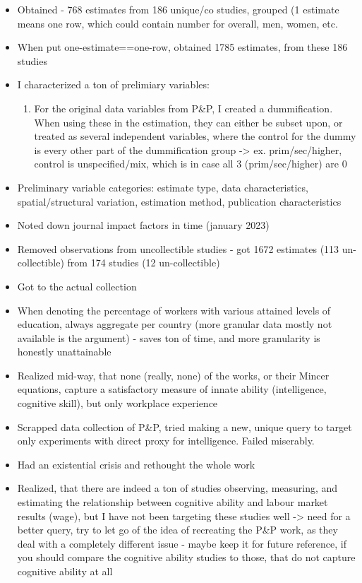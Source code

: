 \begin{itemize}
    \item Obtained - 768 estimates from 186 unique/co studies, grouped (1 estimate means one row, which could contain number for overall, men, women, etc.
    \item When put one-estimate==one-row, obtained 1785 estimates, from these 186 studies
    \item I characterized a ton of prelimiary variables:
        \begin{enumerate}
            \item For the original data variables from P\&P, I created a dummification. When using these in the estimation, they can either be subset upon, or treated as several independent variables, where the control for the dummy is every other part of the dummification group -> ex. prim/sec/higher, control is unspecified/mix, which is in case all 3 (prim/sec/higher) are 0
        \end{enumerate}
    \item Preliminary variable categories: estimate type, data characteristics, spatial/structural variation, estimation method, publication characteristics
    \item Noted down journal impact factors in time (january 2023)
    \item Removed observations from uncollectible studies - got 1672 estimates (113 un-collectible) from 174 studies (12 un-collectible)
    \item Got to the actual collection
    \item When denoting the percentage of workers with various attained levels of education, always aggregate per country (more granular data mostly not available is the argument) - saves ton of time, and more granularity is honestly unattainable
    \item Realized mid-way, that none (really, none) of the works, or their Mincer equations, capture a satisfactory measure of innate ability (intelligence, cognitive skill), but only workplace experience
    \item Scrapped data collection of P\&P, tried making a new, unique query to target only experiments with direct proxy for intelligence. Failed miserably.
    \item Had an existential crisis and rethought the whole work
    \item Realized, that there are indeed a ton of studies observing, measuring, and estimating the relationship between cognitive ability and labour market results (wage), but I have not been targeting these studies well -> need for a better query, try to let go of the idea of recreating the P\&P work, as they deal with a completely different issue - maybe keep it for future reference, if you should compare the cognitive ability studies to those, that do not capture cognitive ability at all

\end{itemize}
